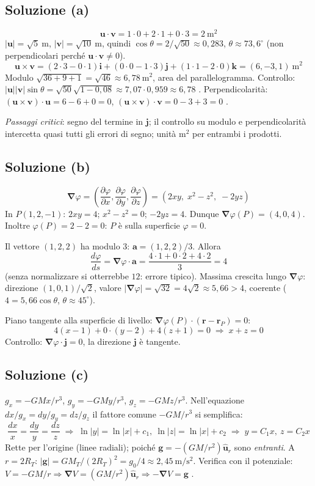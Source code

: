 \documentclass[11pt,a4paper]{article}
\newcommand{\vv}[1]{\mathbf{#1}}
\newcommand{\ur}{\hat{\mathbf{u}}_r}
\newcommand{\pd}[2]{\dfrac{\partial #1}{\partial #2}}
\newcommand{\mo}[1]{\left|#1\right|}
\newcommand{\unit}[1]{\ \mathrm{#1}}
\newcommand{\nab}{\boldsymbol{\nabla}}
\begin{document}
\subsection*{Soluzione (a)}
\[
\vv u\cdot\vv v=1\cdot0+2\cdot1+0\cdot3=2\unit{m^2}
\]
$\mo{\vv u}=\sqrt5\unit m$, $\mo{\vv v}=\sqrt{10}\unit m$, quindi $\cos\theta=2/\sqrt{50}\approx0{,}283$, $\theta\approx73{,}6^\circ$ (non perpendicolari perché $\vv u\cdot\vv v\neq0$).
\[
\vv u\times\vv v=(2\cdot3-0\cdot1)\vv i+(0\cdot0-1\cdot3)\vv j+(1\cdot1-2\cdot0)\vv k=(6,-3,1)\unit{m^2}
\]
Modulo $\sqrt{36+9+1}=\sqrt{46}\approx6{,}78\unit{m^2}$, area del parallelogramma. Controllo: $\mo{\vv u}\mo{\vv v}\sin\theta=\sqrt{50}\sqrt{1-0{,}08}\approx7{,}07\cdot0{,}959\approx6{,}78$ \checkmark. Perpendicolarità: $(\vv u\times\vv v)\cdot\vv u=6-6+0=0$, $(\vv u\times\vv v)\cdot\vv v=0-3+3=0$ \checkmark.

\emph{Passaggi critici}: segno del termine in $\vv j$; il controllo su modulo e perpendicolarità intercetta quasi tutti gli errori di segno; unità $\mathrm{m^2}$ per entrambi i prodotti.

\subsection*{Soluzione (b)}
\[
\nab\varphi=\left(\pd\varphi x,\pd\varphi y,\pd\varphi z\right)=\left(2xy,\;x^2-z^2,\;-2yz\right)
\]
In $P(1,2,-1)$: $2xy=4$; $x^2-z^2=0$; $-2yz=4$. Dunque $\nab\varphi(P)=(4,0,4)$. Inoltre $\varphi(P)=2-2=0$: $P$ è sulla superficie $\varphi=0$.

Il vettore $(1,2,2)$ ha modulo $3$: $\vv a=(1,2,2)/3$. Allora
\[
\frac{d\varphi}{ds}=\nab\varphi\cdot\vv a=\frac{4\cdot1+0\cdot2+4\cdot2}{3}=4
\]
(senza normalizzare si otterrebbe $12$: errore tipico). Massima crescita lungo $\nab\varphi$: direzione $(1,0,1)/\sqrt2$, valore $\mo{\nab\varphi}=\sqrt{32}=4\sqrt2\approx5{,}66>4$, coerente ($4=5{,}66\cos\theta$, $\theta\approx45^\circ$).

Piano tangente alla superficie di livello: $\nab\varphi(P)\cdot(\vv r-\vv r_P)=0$:
\[
4(x-1)+0\cdot(y-2)+4(z+1)=0\;\Longrightarrow\;x+z=0
\]
Controllo: $\nab\varphi\cdot\vv j=0$, la direzione $\vv j$ è tangente.

\subsection*{Soluzione (c)}
$g_x=-GMx/r^3$, $g_y=-GMy/r^3$, $g_z=-GMz/r^3$. Nell'equazione $dx/g_x=dy/g_y=dz/g_z$ il fattore comune $-GM/r^3$ si semplifica:
\[
\frac{dx}{x}=\frac{dy}{y}=\frac{dz}{z}\;\Longrightarrow\;\ln\mo y=\ln\mo x+c_1,\ \ln\mo z=\ln\mo x+c_2\;\Longrightarrow\;y=C_1x,\ z=C_2x
\]
Rette per l'origine (linee radiali); poiché $\vv g=-(GM/r^2)\ur$ sono \emph{entranti}. A $r=2R_T$: $\mo{\vv g}=GM_T/(2R_T)^2=g_0/4\approx2{,}45\unit{m/s^2}$. Verifica con il potenziale: $V=-GM/r\Rightarrow\nab V=(GM/r^2)\ur\Rightarrow-\nab V=\vv g$ \checkmark.
\end{document}
